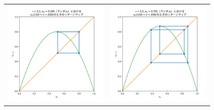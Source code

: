 \begin{figure}[htbp]
\begin{tabular}{cc}
    \begin{minipage}[t]{0.45\hsize}
      \centering
      \includegraphics[keepaspectratio, scale=0.3]{images/Problem3/report4_3.png}
    \end{minipage} &
    \begin{minipage}[t]{0.45\hsize}
      \centering
      \includegraphics[keepaspectratio, scale=0.3]{images/Problem3/report4_4.png}
    \end{minipage} \\


\end{tabular}
\end{figure}
